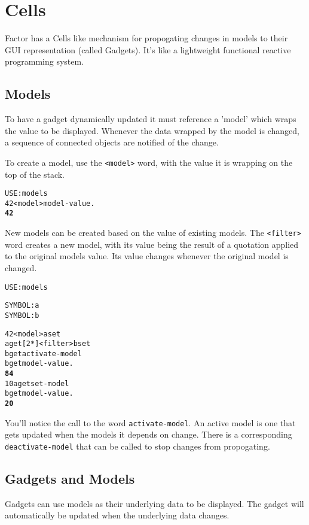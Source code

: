 \chapter{Cells}\label{cells}

Factor has a Cells like mechanism for propogating changes in models to
their GUI representation (called Gadgets). It's like a lightweight
functional reactive programming system. 

\section{Models}
To have a gadget dynamically updated it must reference a 'model' which
wraps the value to be displayed. Whenever the data wrapped by the
model is changed, a sequence of connected objects are notified of the
change.  

To create a model, use the \verb|<model>| word, with the value it is wrapping
on the top of the stack.

\begin{alltt}
USE: models
42 <model> model-value .
  \textbf{42}
\end{alltt}

New models can be created based on the value of existing models. The \verb|<filter>| word creates a new model, with its value being the result of a quotation applied to the original models value. Its value changes whenever the original model is changed.
\begin{alltt}
USE: models

SYMBOL: a
SYMBOL: b

42 <model> a set
a get [ 2 * ] <filter> b set
b get activate-model
b get model-value .
  \textbf{84}
10 a get set-model
b get model-value .
  \textbf{20}
\end{alltt}
You'll notice the call to the word \verb|activate-model|. An active model is one that gets updated when the models it depends on change. There is a corresponding \verb|deactivate-model| that can be called to stop changes from propogating.



\section{Gadgets and Models}
Gadgets can use models as their underlying data to be displayed. The gadget will automatically be updated when the underlying data changes. 

